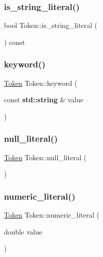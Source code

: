 \subsubsection{\texorpdfstring{is\+\_\+string\+\_\+literal()}{is\_string\_literal()}}
{\footnotesize\ttfamily bool Token\+::is\+\_\+string\+\_\+literal (\begin{DoxyParamCaption}{ }\end{DoxyParamCaption}) const}

\mbox{\label{class_token_a8c0612a3b0a9b6eb05dfd9e75aafcb33}} 
\subsubsection{\texorpdfstring{keyword()}{keyword()}}
{\footnotesize\ttfamily \hyperlink{class_token}{Token} Token\+::keyword (\begin{DoxyParamCaption}\item[{const \textbf{ std\+::string} \&}]{value }\end{DoxyParamCaption})\hspace{0.3cm}{\ttfamily [static]}}

\mbox{\label{class_token_a14d7666a206aae66e9d78b0c99db9c35}} 
\subsubsection{\texorpdfstring{null\+\_\+literal()}{null\_literal()}}
{\footnotesize\ttfamily \hyperlink{class_token}{Token} Token\+::null\+\_\+literal (\begin{DoxyParamCaption}{ }\end{DoxyParamCaption})\hspace{0.3cm}{\ttfamily [static]}}

\mbox{\label{class_token_ab457a4f53eef0512a5fd2ea0206e3c1e}} 
\subsubsection{\texorpdfstring{numeric\+\_\+literal()}{numeric\_literal()}}
{\footnotesize\ttfamily \hyperlink{class_token}{Token} Token\+::numeric\+\_\+literal (\begin{DoxyParamCaption}\item[{double}]{value }\end{DoxyParamCaption})\hspace{0.3cm}{\ttfamily [static]}}

